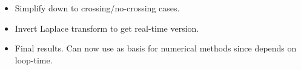 \begin{itemize}
    \item Simplify down to crossing/no-crossing cases.
  \item {Invert Laplace transform to get real-time version.}

  \item {Final results.  Can now use as basis for numerical methods since depends on loop-time.}


\end{itemize}
